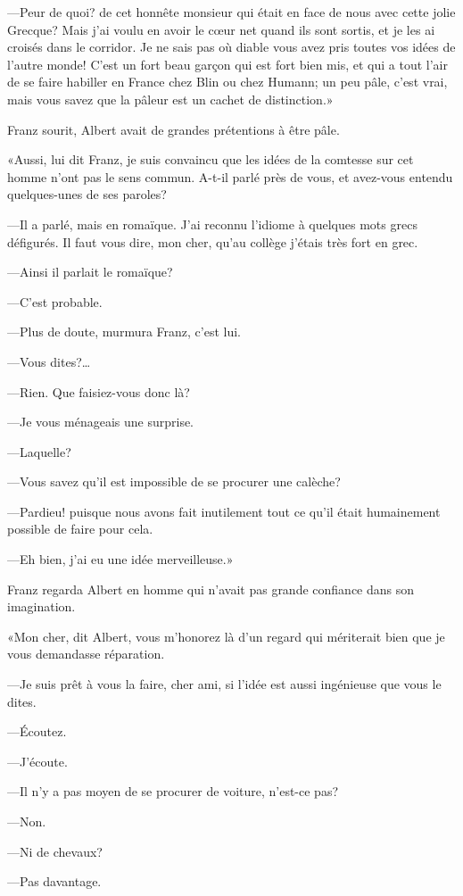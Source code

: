 —Peur de quoi? de cet honnête monsieur qui était en face de nous avec cette jolie Grecque? Mais j'ai voulu en avoir le cœur net quand ils sont sortis, et je les ai croisés dans le corridor. Je ne sais pas où diable vous avez pris toutes vos idées de l'autre monde! C'est un fort beau garçon qui est fort bien mis, et qui a tout l'air de se faire habiller en France chez Blin ou chez Humann; un peu pâle, c'est vrai, mais vous savez que la pâleur est un cachet de distinction.» 

Franz sourit, Albert avait de grandes prétentions à être pâle. 

«Aussi, lui dit Franz, je suis convaincu que les idées de la comtesse sur cet homme n'ont pas le sens commun. A-t-il parlé près de vous, et avez-vous entendu quelques-unes de ses paroles?  

—Il a parlé, mais en romaïque. J'ai reconnu l'idiome à quelques mots grecs défigurés. Il faut vous dire, mon cher, qu'au collège j'étais très fort en grec. 

—Ainsi il parlait le romaïque? 

—C'est probable. 

—Plus de doute, murmura Franz, c'est lui. 

—Vous dites?\dots 

—Rien. Que faisiez-vous donc là? 

—Je vous ménageais une surprise. 

—Laquelle? 

—Vous savez qu'il est impossible de se procurer une calèche? 

—Pardieu! puisque nous avons fait inutilement tout ce qu'il était humainement possible de faire pour cela. 

—Eh bien, j'ai eu une idée merveilleuse.» 

Franz regarda Albert en homme qui n'avait pas grande confiance dans son imagination. 

«Mon cher, dit Albert, vous m'honorez là d'un regard qui mériterait bien que je vous demandasse réparation. 

—Je suis prêt à vous la faire, cher ami, si l'idée est aussi ingénieuse que vous le dites. 

—Écoutez. 

—J'écoute. 

—Il n'y a pas moyen de se procurer de voiture, n'est-ce pas? 

—Non. 

—Ni de chevaux?  

—Pas davantage. 

